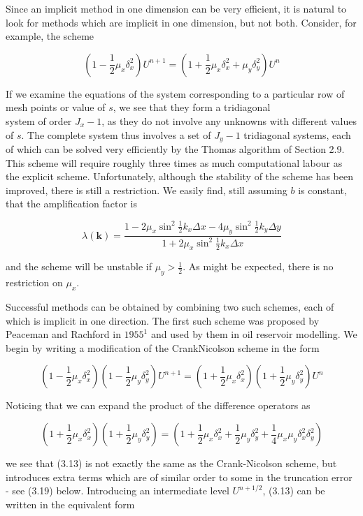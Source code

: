 \documentclass[10pt]{article}
\begin{document}
Since an implicit method in one dimension can be very efficient, it is natural to look for methods which are implicit in one dimension, but not both. Consider, for example, the scheme

\[
\left(1-\frac{1}{2} \mu_{x} \delta_{x}^{2}\right) U^{n+1}=\left(1+\frac{1}{2} \mu_{x} \delta_{x}^{2}+\mu_{y} \delta_{y}^{2}\right) U^{n}
\]

If we examine the equations of the system corresponding to a particular row of mesh points or value of \(s\), we see that they form a tridiagonal\\
system of order \(J_{x}-1\), as they do not involve any unknowns with different values of \(s\). The complete system thus involves a set of \(J_{y}-1\) tridiagonal systems, each of which can be solved very efficiently by the Thomas algorithm of Section 2.9. This scheme will require roughly three times as much computational labour as the explicit scheme. Unfortunately, although the stability of the scheme has been improved, there is still a restriction. We easily find, still assuming \(b\) is constant, that the amplification factor is

\[
\lambda(\mathbf{k})=\frac{1-2 \mu_{x} \sin ^{2} \frac{1}{2} k_{x} \Delta x-4 \mu_{y} \sin ^{2} \frac{1}{2} k_{y} \Delta y}{1+2 \mu_{x} \sin ^{2} \frac{1}{2} k_{x} \Delta x}
\]

and the scheme will be unstable if \(\mu_{y}>\frac{1}{2}\). As might be expected, there is no restriction on \(\mu_{x}\).

Successful methods can be obtained by combining two such schemes, each of which is implicit in one direction. The first such scheme was proposed by Peaceman and Rachford in \(1955^{1}\) and used by them in oil reservoir modelling. We begin by writing a modification of the CrankNicolson scheme in the form

\[
\left(1-\frac{1}{2} \mu_{x} \delta_{x}^{2}\right)\left(1-\frac{1}{2} \mu_{y} \delta_{y}^{2}\right) U^{n+1}=\left(1+\frac{1}{2} \mu_{x} \delta_{x}^{2}\right)\left(1+\frac{1}{2} \mu_{y} \delta_{y}^{2}\right) U^{n}
\]

Noticing that we can expand the product of the difference operators as

\[
\left(1+\frac{1}{2} \mu_{x} \delta_{x}^{2}\right)\left(1+\frac{1}{2} \mu_{y} \delta_{y}^{2}\right)=\left(1+\frac{1}{2} \mu_{x} \delta_{x}^{2}+\frac{1}{2} \mu_{y} \delta_{y}^{2}+\frac{1}{4} \mu_{x} \mu_{y} \delta_{x}^{2} \delta_{y}^{2}\right)
\]

we see that (3.13) is not exactly the same as the Crank-Nicolson scheme, but introduces extra terms which are of similar order to some in the truncation error - see (3.19) below. Introducing an intermediate level \(U^{n+1 / 2}\), (3.13) can be written in the equivalent form
\end{document}
